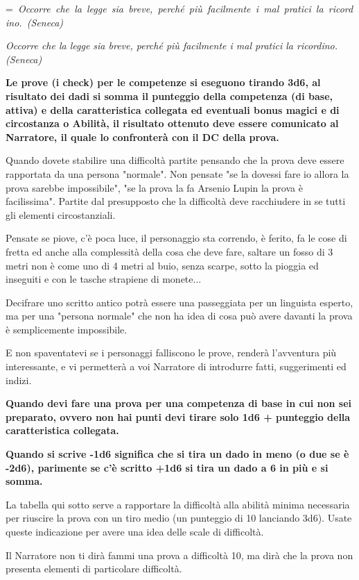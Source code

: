 \documentclass[a4paper,11pt,twoside,openany]{book}
\makeatletter
\newcommand{\mybox}[1]{%
	\setbox0=\hbox{#1}%
	\setlength{\@tempdima}{\dimexpr\wd0+13pt}%
	\begin{tcolorbox}[boxrule=0.5pt,arc=4pt, breakable,enhanced,
		left=6pt,right=6pt,top=6pt,bottom=6pt,boxsep=0pt,width=\@tempdima]
		#1
	\end{tcolorbox}
}
\makeatother
\begin{document}
\label{regole-per-le-competenze}
\mybox{\textit{
Occorre che la legge sia breve, perché più facilmente i mal pratici la ricordino. (Seneca)
}}\medskip

\textbf{Le prove (i check) per le competenze si eseguono tirando 3d6, al risultato dei dadi si somma il punteggio della competenza (di base, attiva) e della caratteristica collegata ed eventuali bonus magici e di circostanza o Abilità, il risultato ottenuto deve essere comunicato al Narratore, il quale lo confronterà con il DC della prova.}

Quando dovete stabilire una difficoltà partite pensando che la prova deve essere rapportata da una persona "normale". Non pensate "se la dovessi fare io allora la prova sarebbe impossibile", "se la prova la fa Arsenio Lupin la prova è facilissima". Partite dal presupposto che la difficoltà deve racchiudere in se tutti gli elementi circostanziali.

Pensate se piove, c'è poca luce, il personaggio sta correndo, è ferito, fa le cose di fretta ed anche alla complessità della cosa che deve fare, saltare un fosso di 3 metri non è come uno di 4 metri al buio, senza scarpe, sotto la pioggia ed inseguiti e con le tasche strapiene di monete...

Decifrare uno scritto antico potrà essere una passeggiata per un linguista esperto, ma per una "persona normale" che non ha idea di cosa può avere davanti la prova è semplicemente impossibile.

E non spaventatevi se i personaggi falliscono le prove, renderà l'avventura più interessante, e vi permetterà a voi Narratore di introdurre fatti, suggerimenti ed indizi.

\bigskip

\textbf{Quando devi fare una prova per una competenza di base in cui non sei preparato, ovvero non hai punti devi tirare solo 1d6 + punteggio della caratteristica collegata.}

\textbf{Quando si scrive -1d6 significa che si tira un dado in meno (o due se è -2d6), parimente se c'è scritto +1d6 si tira un dado a 6 in più e si somma.}

\bigskip

La tabella qui sotto serve a rapportare la difficoltà alla abilità minima necessaria per riuscire la prova con un tiro medio (un punteggio di 10 lanciando 3d6). Usate queste indicazione per avere una idea delle scale di difficoltà.

Il Narratore non ti dirà fammi una prova a difficoltà 10, ma dirà che la prova non presenta elementi di particolare difficoltà.
\end{document}
